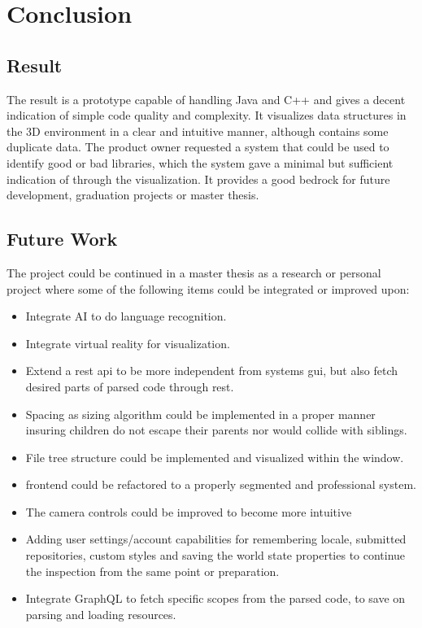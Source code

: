 \chapter{Conclusion}
\label{chap:conclusion}
\section{Result}
The result is a prototype capable of handling Java and C++ and gives a decent indication of simple code quality and complexity. It visualizes data structures in the 3D environment in a clear and intuitive manner, although contains some duplicate data. The product owner requested a system that could be used to identify good or bad libraries, which the system gave a minimal but sufficient indication of through the visualization. It provides a good bedrock for future development, graduation projects or master thesis.

\section{Future Work}
\label{sec:future}
The project could be continued in a master thesis as a research or personal project where some of the following items could be integrated or improved upon:

\begin{itemize}
    \item Integrate AI to do language recognition.
    \item Integrate virtual reality for visualization.
    \item Extend a \gls{rest} \gls{api} to be more independent from systems \gls{gui}, but also fetch desired parts of parsed code through \gls{rest}.
    \item Spacing as sizing algorithm could be implemented in a proper manner insuring children do not escape their parents nor would collide with siblings.
    \item File tree structure could be implemented and visualized within the window.
    \item \gls{frontend} could be refactored to a properly segmented and professional system.
    \item The camera controls could be improved to become more intuitive
    \item Adding user settings/account capabilities for remembering locale, submitted repositories, custom styles and saving the world state properties to continue the inspection from the same point or preparation.
    \item Integrate  GraphQL to fetch specific scopes from the parsed code, to save on parsing and loading resources.
\end{itemize}

